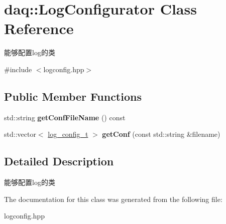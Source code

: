 \hypertarget{classdaq_1_1LogConfigurator}{}\section{daq\+:\+:Log\+Configurator Class Reference}
\label{classdaq_1_1LogConfigurator}


能够配置log的类  




{\ttfamily \#include $<$logconfig.\+hpp$>$}

\subsection*{Public Member Functions}
\begin{DoxyCompactItemize}
\item 
\mbox{\label{classdaq_1_1LogConfigurator_ab1053721ed0940c15397fe0dbf42560c}} 
std\+::string {\bfseries get\+Conf\+File\+Name} () const
\item 
\mbox{\label{classdaq_1_1LogConfigurator_a862bc0ecc399b8069aec436f855dd828}} 
std\+::vector$<$ \hyperlink{structdaq_1_1LogConfigStruct}{log\+\_\+config\+\_\+t} $>$ {\bfseries get\+Conf} (const std\+::string \&filename)
\end{DoxyCompactItemize}


\subsection{Detailed Description}
能够配置log的类 

The documentation for this class was generated from the following file\+:\begin{DoxyCompactItemize}
\item 
logconfig.\+hpp\end{DoxyCompactItemize}
